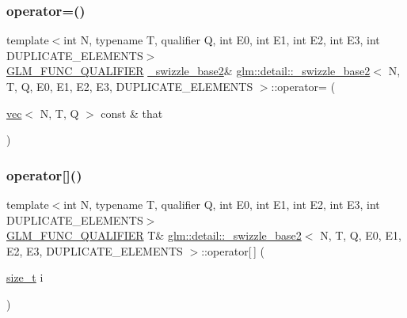 \mbox{\label{structglm_1_1detail_1_1__swizzle__base2_a70f9bb1c990a71a55d125abc36c6849b}} 
\subsubsection{\texorpdfstring{operator=()}{operator=()}\hspace{0.1cm}{\footnotesize\ttfamily [2/2]}}
{\footnotesize\ttfamily template$<$int N, typename T, qualifier Q, int E0, int E1, int E2, int E3, int D\+U\+P\+L\+I\+C\+A\+T\+E\+\_\+\+E\+L\+E\+M\+E\+N\+TS$>$ \\
\mbox{\hyperlink{setup_8hpp_a33fdea6f91c5f834105f7415e2a64407}{G\+L\+M\+\_\+\+F\+U\+N\+C\+\_\+\+Q\+U\+A\+L\+I\+F\+I\+ER}} \mbox{\hyperlink{structglm_1_1detail_1_1__swizzle__base2}{\+\_\+swizzle\+\_\+base2}}\& \mbox{\hyperlink{structglm_1_1detail_1_1__swizzle__base2}{glm\+::detail\+::\+\_\+swizzle\+\_\+base2}}$<$ N, T, Q, E0, E1, E2, E3, D\+U\+P\+L\+I\+C\+A\+T\+E\+\_\+\+E\+L\+E\+M\+E\+N\+TS $>$\+::operator= (\begin{DoxyParamCaption}\item[{\mbox{\hyperlink{structglm_1_1vec}{vec}}$<$ N, T, Q $>$ const \&}]{that }\end{DoxyParamCaption})\hspace{0.3cm}{\ttfamily [inline]}}

\mbox{\label{structglm_1_1detail_1_1__swizzle__base2_a9a31c29fd5419a40ef6ae9dbbbb3887e}} 
\subsubsection{\texorpdfstring{operator[]()}{operator[]()}\hspace{0.1cm}{\footnotesize\ttfamily [1/2]}}
{\footnotesize\ttfamily template$<$int N, typename T, qualifier Q, int E0, int E1, int E2, int E3, int D\+U\+P\+L\+I\+C\+A\+T\+E\+\_\+\+E\+L\+E\+M\+E\+N\+TS$>$ \\
\mbox{\hyperlink{setup_8hpp_a33fdea6f91c5f834105f7415e2a64407}{G\+L\+M\+\_\+\+F\+U\+N\+C\+\_\+\+Q\+U\+A\+L\+I\+F\+I\+ER}} T\& \mbox{\hyperlink{structglm_1_1detail_1_1__swizzle__base2}{glm\+::detail\+::\+\_\+swizzle\+\_\+base2}}$<$ N, T, Q, E0, E1, E2, E3, D\+U\+P\+L\+I\+C\+A\+T\+E\+\_\+\+E\+L\+E\+M\+E\+N\+TS $>$\+::operator\mbox{[}$\,$\mbox{]} (\begin{DoxyParamCaption}\item[{\mbox{\hyperlink{_s_d_l__config__winrt_8h_a7c94ea6f8948649f8d181ae55911eeaf}{size\+\_\+t}}}]{i }\end{DoxyParamCaption})\hspace{0.3cm}{\ttfamily [inline]}}

